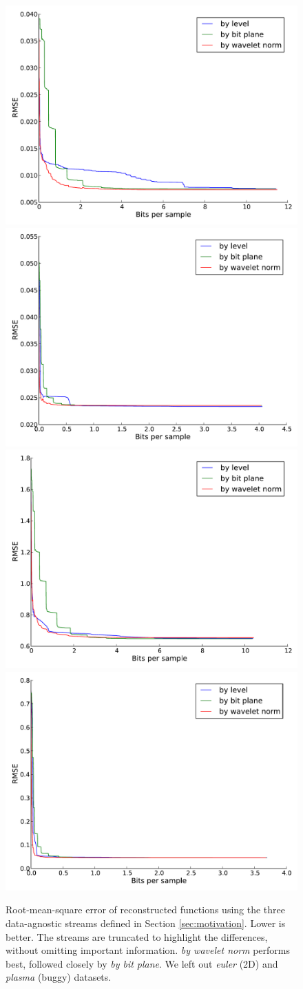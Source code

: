 \begin{figure}
  \centering
  {\includegraphics[width=0.48\linewidth]{img/motivation-3d/rmse-boiler.pdf}}
 	{\includegraphics[width=0.48\linewidth]{img/motivation-3d/rmse-diffusivity.pdf}}
 	{\includegraphics[width=0.48\linewidth]{img/motivation-3d/rmse-turbulence.pdf}}
 	{\includegraphics[width=0.48\linewidth]{img/motivation-3d/rmse-velocityz.pdf}}
 	\caption{Root-mean-square error of reconstructed functions using the three data-agnostic streams
 	defined in Section \ref{sec:motivation}. Lower is better. The streams are truncated to highlight
 	the differences, without omitting important information. \emph{by wavelet norm} performs best,
 	followed closely by \emph{by bit plane}. We left out \emph{euler} (2D) and \emph{plasma} (buggy) datasets.}
 	\label{fig:motivation-3d-rmse}
\end{figure}


